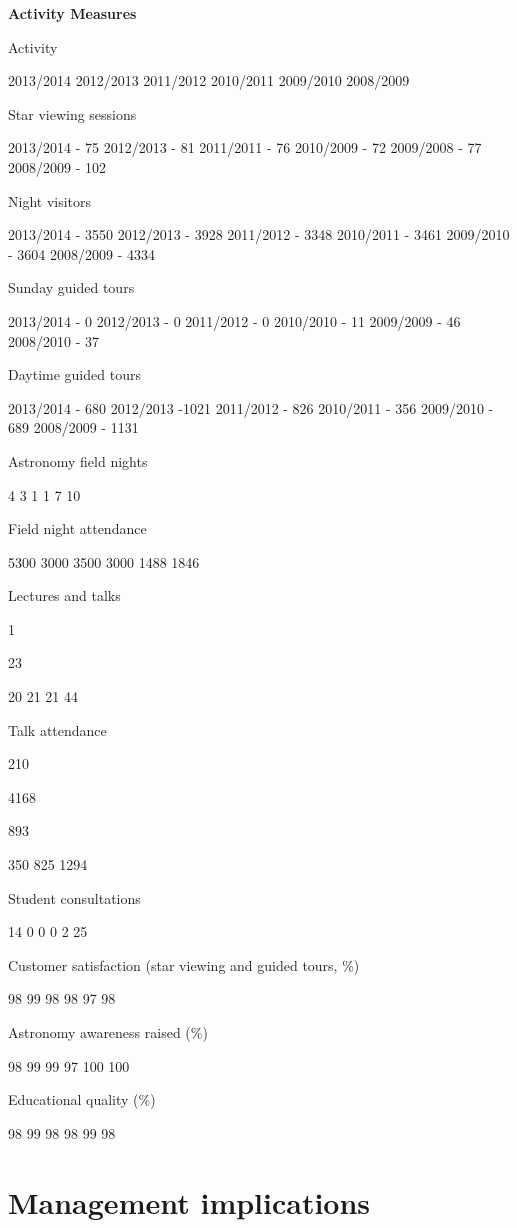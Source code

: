 \documentclass[version=last, paper=a4, DIV=18, usenames, dvipsnames]{scrartcl}
\begin{document}
\textbf{Activity Measures}


Activity


2013/2014
2012/2013
2011/2012
2010/2011
2009/2010
2008/2009


Star viewing sessions


2013/2014 - 75
2012/2013 - 81
2011/2011 - 76
2010/2009 - 72
2009/2008 - 77
2008/2009 - 102


Night visitors


2013/2014 - 3550
2012/2013 - 3928
2011/2012 - 3348
2010/2011 - 3461
2009/2010 - 3604 
2008/2009 - 4334


Sunday guided tours


2013/2014 - 0
2012/2013 - 0
2011/2012 - 0
2010/2010 - 11
2009/2009 - 46
2008/2010 - 37


Daytime guided tours


2013/2014 - 680
2012/2013 -1021
2011/2012 - 826
2010/2011 - 356
2009/2010 - 689
2008/2009 - 1131


Astronomy field nights


4
3
1
1
7
10


Field night attendance


5300
3000
3500
3000
1488
1846


Lectures and talks


1


23


20
21
21
44


Talk attendance


210


4168


893


350
825
1294


Student consultations


14
0
0
0
2
25


Customer satisfaction (star viewing and guided tours, \%)


98
99
98
98
97
98


Astronomy awareness raised (\%)


98
99
99
97
100
100


Educational quality (\%)


98
99
98
98
99
98






\section{Management implications}
\end{document}
